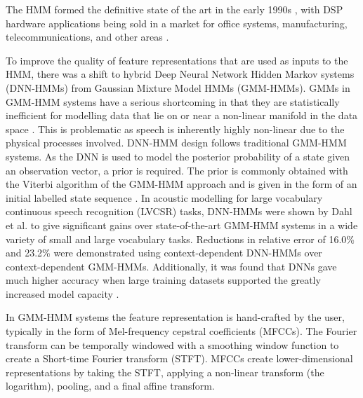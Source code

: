 \documentclass[12pt]{llncs}
\begin{document}
The HMM formed the definitive state of the art in the early 1990s \cite{rabiner1989tutorial}, with DSP hardware applications being sold in a market for office systems, manufacturing, telecommunications, and other areas \cite[p.487]{rabiner1993fundamentals}. 



To improve the quality of feature representations that are used as inputs to the HMM, there was a shift to hybrid Deep Neural Network Hidden Markov systems (DNN-HMMs) from Gaussian Mixture Model HMMs (GMM-HMMs). GMMs in GMM-HMM systems have a serious shortcoming in that they are statistically inefficient for modelling data that lie on or near a non-linear manifold in the data space \cite{hinton2012deep}. This is problematic as speech is inherently highly non-linear due to the physical processes involved. DNN-HMM design follows traditional GMM-HMM systems. As the DNN is used to model the posterior probability of a state given an observation vector, a prior is required. The prior is commonly obtained with the Viterbi algorithm of the GMM-HMM approach and is given in the form of an initial labelled state sequence \cite{li2013hybrid}. In acoustic modelling for large vocabulary continuous speech recognition (LVCSR) tasks, DNN-HMMs were shown by Dahl et al. \cite{dahl2012context} to give significant gains over state-of-the-art GMM-HMM systems in a wide variety of small and large vocabulary tasks. Reductions in relative error of 16.0\% and 23.2\% were demonstrated using context-dependent DNN-HMMs over context-dependent GMM-HMMs. Additionally, it was found that DNNs gave much higher accuracy when large training datasets supported the greatly increased model capacity \cite{deng2014achievements}.

In GMM-HMM systems the feature representation is hand-crafted by the user, typically in the form of Mel-frequency cepstral coefficients (MFCCs). The Fourier transform can be temporally windowed with a smoothing window function to create a Short-time Fourier transform (STFT). MFCCs create lower-dimensional representations by taking the STFT, applying a non-linear transform (the logarithm), pooling, and a final affine transform. 
\end{document}
